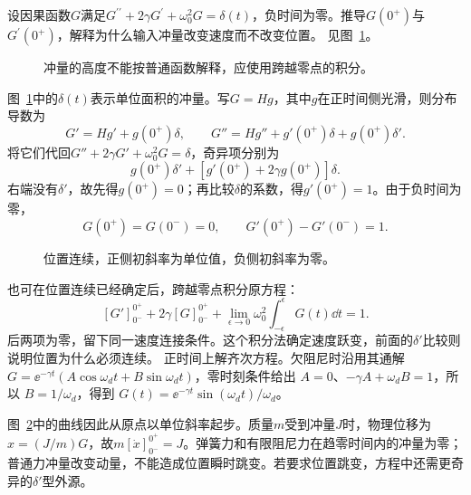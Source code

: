 \begin{exercise}[单位冲量的连接条件]\label{ex:c2-h20}
设因果函数$G$满足$G^{\prime\prime}+2\gamma G^{\prime}+\omega_0^2G=\delta(t)$，负时间为零。推导$G(0^+)$与$G^{\prime}(0^+)$，解释为什么输入冲量改变速度而不改变位置。 见图~\ref{fig:c2-h20-q}。
\end{exercise}

\begin{figure}[H]\centering
{}
\caption{冲量的高度不能按普通函数解释，应使用跨越零点的积分。}\label{fig:c2-h20-q}
\end{figure}
\begin{solution}
图~\ref{fig:c2-h20-q}中的$\delta(t)$表示单位面积的冲量。写$G=Hg$，其中$g$在正时间侧光滑，则分布导数为
\[
 G'=Hg'+g(0^+)\delta,\qquad
 G''=Hg''+g'(0^+)\delta+g(0^+)\delta'.
\]
将它们代回$G''+2\gamma G'+\omega_0^2G=\delta$，奇异项分别为
\[
 g(0^+)\delta'
 +[g'(0^+)+2\gamma g(0^+)]\delta.
\]
右端没有$\delta'$，故先得$g(0^+)=0$；再比较$\delta$的系数，得$g'(0^+)=1$。由于负时间为零，
\[
 \boxed{G(0^+)=G(0^-)=0,\qquad
 G'(0^+)-G'(0^-)=1}.
\]
\begin{figure}[H]\centering
{}
\caption{位置连续，正侧初斜率为单位值，负侧初斜率为零。}\label{fig:c2-h20-s}
\end{figure}
也可在位置连续已经确定后，跨越零点积分原方程：
\[
 [G']_{0^-}^{0^+}+2\gamma[G]_{0^-}^{0^+}
 +\lim_{\epsilon\to0}\omega_0^2
 \int_{-\epsilon}^{\epsilon}G(t)\dd t=1.
\]
后两项为零，留下同一速度连接条件。这个积分法确定速度跃变，前面的$\delta'$比较则说明位置为什么必须连续。
正时间上解齐次方程。欠阻尼时沿用其通解 $G=\ee^{-\gamma t}(A\cos\omega_dt+B\sin\omega_dt)$，零时刻条件给出 $A=0$、$-\gamma A+\omega_dB=1$，所以 $B=1/\omega_d$，得到 $G(t)=\ee^{-\gamma t}\sin(\omega_dt)/\omega_d$。

图~\ref{fig:c2-h20-s}中的曲线因此从原点以单位斜率起步。质量$m$受到冲量$J$时，物理位移为$x=(J/m)G$，故$m[\dot x]_{0^-}^{0^+}=J$。弹簧力和有限阻尼力在趋零时间内的冲量为零；普通力冲量改变动量，不能造成位置瞬时跳变。若要求位置跳变，方程中还需更奇异的$\delta'$型外源。
\end{solution}


